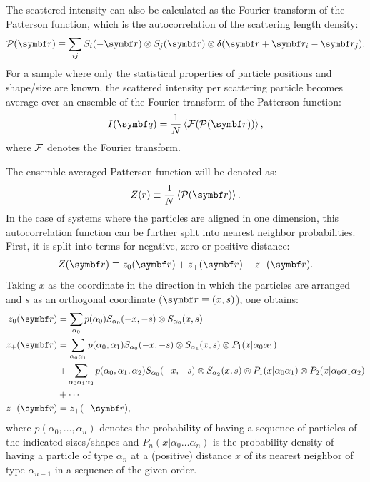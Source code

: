 The scattered intensity can also be calculated as the Fourier transform of the Patterson function, which is the autocorrelation of the scattering length density:
\begin{equation*}
  \curlp (\r ) \equiv \sum_{ij} S_i(-\r )\otimes S_j(\r )\otimes \delta (\r + \r_i - \r_j ).
\end{equation*}
For a sample where only the statistical properties of particle positions and shape/size are known, the scattered intensity per scattering particle becomes average over an ensemble of the Fourier transform of the Patterson function:
\begin{equation*}
  I(\q ) = \frac{1}{N}\bra\curlf (\curlp (\r ))\ket,
\end{equation*}
where $\mathcal{F}$ denotes the Fourier transform.

The ensemble averaged Patterson function will be denoted as:
\begin{equation*}
  Z(r) \equiv \frac{1}{N}\bra\curlp (\r )\ket.
\end{equation*}
In the case of systems where the particles are aligned in one dimension, this autocorrelation function can be further split into nearest neighbor probabilities. First, it is split into terms for negative, zero or positive distance:
\begin{equation*}
  Z(\r ) \equiv z_0(\r ) + z_+(\r ) + z_-(\r ).
\end{equation*}
Taking $x$ as the coordinate in the direction in which the particles are arranged and $s$ as an orthogonal coordinate ($\r \equiv (x,s)$), one obtains:
\begin{align*}
  z_0(\r ) &= \sum_{\alpha_0} p(\alpha_0) S_{\alpha_0}(-x,-s) \otimes S_{\alpha_0}(x,s)  \\
  z_+(\r ) &= \sum_{\alpha_0\alpha_1} p(\alpha_0,\alpha_1) S_{\alpha_0}(-x,-s) \otimes S_{\alpha_1}(x,s) \otimes P_1(x|\alpha_0\alpha_1)  \\
               &+ \sum_{\alpha_0\alpha_1\alpha_2} p(\alpha_0,\alpha_1,\alpha_2) S_{\alpha_0}(-x,-s) \otimes S_{\alpha_2}(x,s) \otimes P_1(x|\alpha_0\alpha_1) \otimes P_2(x|\alpha_0\alpha_1\alpha_2)  \\
               &+ \dotsb \\
  z_-(\r ) &= z_+(-\r ),
\end{align*}
where $p(\alpha_0,\dotsc ,\alpha_n)$ denotes the probability of having a sequence of particles of the indicated sizes/shapes and $P_n(x|\alpha_0\dotsc\alpha_n)$ is the probability density of having a particle of type $\alpha_n$ at a (positive) distance $x$ of its nearest neighbor of type $\alpha_{n-1}$ in a sequence of the given order.

